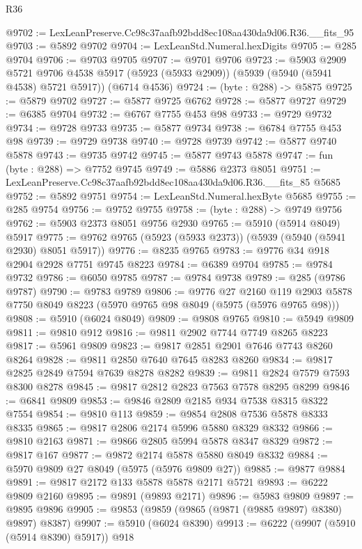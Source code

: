 \begin{lexlean}{R36}
\begin{coremodule}
@9702 := LexLeanPreserve.Cc98c37aafb92bdd8ec108aa430da9d06.R36.__fits_95
@9703 := @5892 @9702
@9704 := LexLeanStd.Numeral.hexDigits
@9705 := @285 @9704
@9706 := @9703 @9705
@9707 := @9701 @9706
@9723 := @5903
    @2909
    @5721
    @9706
    @4538
    @5917
    (@5923 (@5933 @2909))
    (@5939 (@5940 (@5941 @4538) @5721 @5917))
    (@6714 @4536)
@9724 := (byte : @288) -> @5875
@9725 := @5879 @9702
@9727 := @5877 @9725 @6762
@9728 := @5877 @9727
@9729 := @6385 @9704
@9732 := @6767 @7755 @453 @98
@9733 := @9729 @9732
@9734 := @9728 @9733
@9735 := @5877 @9734
@9738 := @6784 @7755 @453 @98
@9739 := @9729 @9738
@9740 := @9728 @9739
@9742 := @5877 @9740 @5878
@9743 := @9735 @9742
@9745 := @5877 @9743 @5878
@9747 := fun (byte : @288) => @7752 @9745
@9749 := @5886 @2373 @8051
@9751 := LexLeanPreserve.Cc98c37aafb92bdd8ec108aa430da9d06.R36.__fits_85 @5685
@9752 := @5892 @9751
@9754 := LexLeanStd.Numeral.hexByte @5685
@9755 := @285 @9754
@9756 := @9752 @9755
@9758 := (byte : @288) -> @9749 @9756
@9762 := @5903 @2373 @8051 @9756 @2930
@9765 := @5910 (@5914 @8049) @5917
@9775 := @9762 @9765 (@5923 (@5933 @2373)) (@5939 (@5940 (@5941 @2930) @8051 @5917))
@9776 := @8235 @9765
@9783 := @9776 @34 @918 @2904 @2928 @7751 @9745 @8223
@9784 := @6389 @9704
@9785 := @9784 @9732
@9786 := @6050 @9785
@9787 := @9784 @9738
@9789 := @285 (@9786 @9787)
@9790 := @9783 @9789
@9806 := @9776
    @27
    @2160
    @119
    @2903
    @5878
    @7750
    @8049
    @8223
    (@5970 @9765 @98 @8049 (@5975 (@5976 @9765 @98)))
@9808 := @5910 (@6024 @8049)
@9809 := @9808 @9765
@9810 := @5949 @9809
@9811 := @9810 @912
@9816 := @9811 @2902 @7744 @7749 @8265 @8223
@9817 := @5961 @9809
@9823 := @9817 @2851 @2901 @7646 @7743 @8260 @8264
@9828 := @9811 @2850 @7640 @7645 @8283 @8260
@9834 := @9817 @2825 @2849 @7594 @7639 @8278 @8282
@9839 := @9811 @2824 @7579 @7593 @8300 @8278
@9845 := @9817 @2812 @2823 @7563 @7578 @8295 @8299
@9846 := @6841 @9809
@9853 := @9846 @2809 @2185 @934 @7538 @8315 @8322 @7554
@9854 := @9810 @113
@9859 := @9854 @2808 @7536 @5878 @8333 @8335
@9865 := @9817 @2806 @2174 @5996 @5880 @8329 @8332
@9866 := @9810 @2163
@9871 := @9866 @2805 @5994 @5878 @8347 @8329
@9872 := @9817 @167
@9877 := @9872 @2174 @5878 @5880 @8049 @8332
@9884 := @5970 @9809 @27 @8049 (@5975 (@5976 @9809 @27))
@9885 := @9877 @9884
@9891 := @9817 @2172 @133 @5878 @5878 @2171 @5721
@9893 := @6222 @9809 @2160
@9895 := @9891 (@9893 @2171)
@9896 := @5983 @9809
@9897 := @9895 @9896
@9905 := @9853 (@9859 (@9865 (@9871 (@9885 @9897) @8380) @9897) @8387)
@9907 := @5910 (@6024 @8390)
@9913 := @6222 (@9907 (@5910 (@5914 @8390) @5917)) @918

\end{coremodule}
\end{lexlean}
